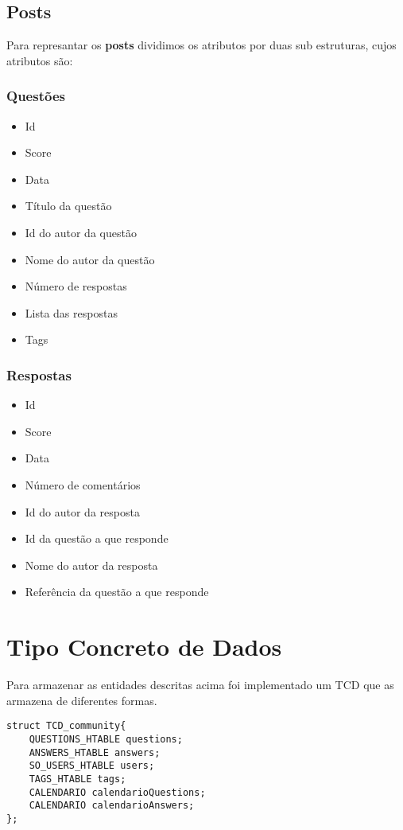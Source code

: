 \documentclass[10pt,a4paper]{report}
\begin{document}
    \section{Posts}
    Para represantar os \textbf{posts} dividimos os atributos por duas
     sub estruturas, cujos atributos são:
        \subsection{Questões}
        \begin{itemize}
            \item Id
            \item Score
            \item Data
            \item Título da questão
            \item Id do autor da questão
            \item Nome do autor da questão
            \item Número de respostas
            \item Lista das respostas
            \item Tags
        \end{itemize}

        \subsection{Respostas}
        \begin{itemize}
            \item Id
            \item Score
            \item Data
            \item Número de comentários
            \item Id do autor da resposta
            \item Id da questão a que responde
            \item Nome do autor da resposta
            \item Referência da questão a que responde
        \end{itemize}


\chapter{Tipo Concreto de Dados}
    Para armazenar as entidades descritas acima foi implementado um TCD que
    as armazena de diferentes formas.
    \begin{verbatim}
struct TCD_community{
    QUESTIONS_HTABLE questions;
    ANSWERS_HTABLE answers;
    SO_USERS_HTABLE users;
    TAGS_HTABLE tags;
    CALENDARIO calendarioQuestions;
    CALENDARIO calendarioAnswers;
};
    \end{verbatim}
\end{document}
